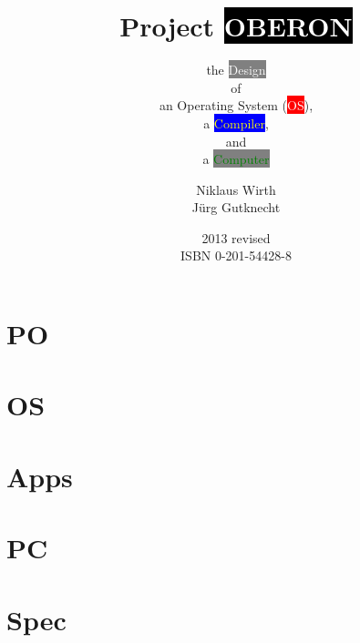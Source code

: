 \documentclass[a5paper,footinclude=true,headinclude=true]{scrbook}
\begin{document}
\title{Project \colorbox{black}{\textcolor{white}{OBERON}}}
\subtitle{ the \colorbox{gray}{\textcolor{white}{Design}}\\of\\an Operating System
              (\colorbox{red}{\textcolor{white}{OS}}),\\a
               \colorbox{blue}{\textcolor{yellow}{Compiler}},\\and\\a
               \colorbox{gray}{\textcolor{green}{Computer}}}
\author{Niklaus Wirth\\Jürg Gutknecht}
\date{2013 revised\\ISBN 0-201-54428-8}
\maketitle
\part*{PO}


\part{OS}








\part{Apps}






\part{PC}


\appendix
\part*{Spec}


\end{document}
